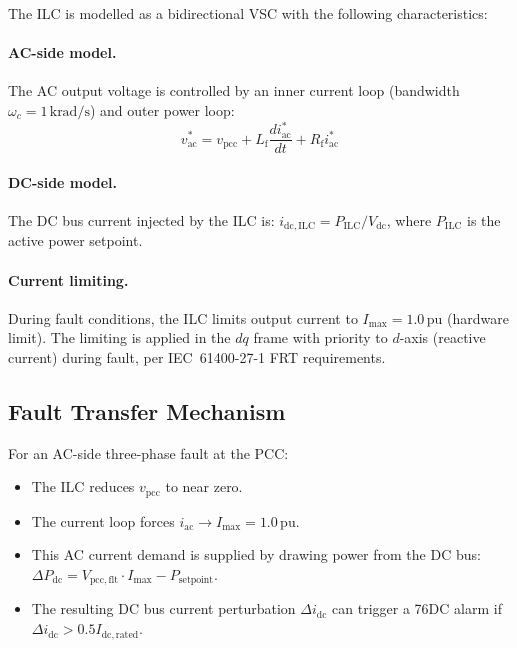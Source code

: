 \documentclass[11pt, a4paper]{article}
\newcommand{\pu}{\,\text{pu}}
\begin{document}
The ILC is modelled as a bidirectional VSC with the following characteristics:

\paragraph{AC-side model.}
The AC output voltage is controlled by an inner current loop (bandwidth
$\omega_c = 1\,\text{krad/s}$) and outer power loop:
\begin{equation}
  v_{\mathrm{ac}}^* = v_{\mathrm{pcc}} + L_{\mathrm{f}}
    \frac{d i_{\mathrm{ac}}^*}{dt} + R_{\mathrm{f}} i_{\mathrm{ac}}^*
  \label{eq:ilc_ac}
\end{equation}

\paragraph{DC-side model.}
The DC bus current injected by the ILC is:
$i_{\mathrm{dc,ILC}} = P_{\mathrm{ILC}} / V_{\mathrm{dc}}$,
where $P_{\mathrm{ILC}}$ is the active power setpoint.

\paragraph{Current limiting.}
During fault conditions, the ILC limits output current to
$I_{\mathrm{max}} = 1.0\pu$ (hardware limit). The limiting is applied
in the $dq$ frame with priority to $d$-axis (reactive current) during
fault, per IEC~61400-27-1 FRT requirements.

\subsection{Fault Transfer Mechanism}

For an AC-side three-phase fault at the PCC:
\begin{itemize}
  \item The ILC reduces $v_{\mathrm{pcc}}$ to near zero.
  \item The current loop forces $i_{\mathrm{ac}} \to I_{\mathrm{max}} = 1.0\pu$.
  \item This AC current demand is supplied by drawing power from the DC bus:
    $\Delta P_{\mathrm{dc}} = V_{\mathrm{pcc,flt}} \cdot I_{\mathrm{max}}
    - P_{\mathrm{setpoint}}$.
  \item The resulting DC bus current perturbation $\Delta i_{\mathrm{dc}}$
    can trigger a 76DC alarm if $\Delta i_{\mathrm{dc}} > 0.5 I_{\mathrm{dc,rated}}$.
\end{itemize}
\end{document}
